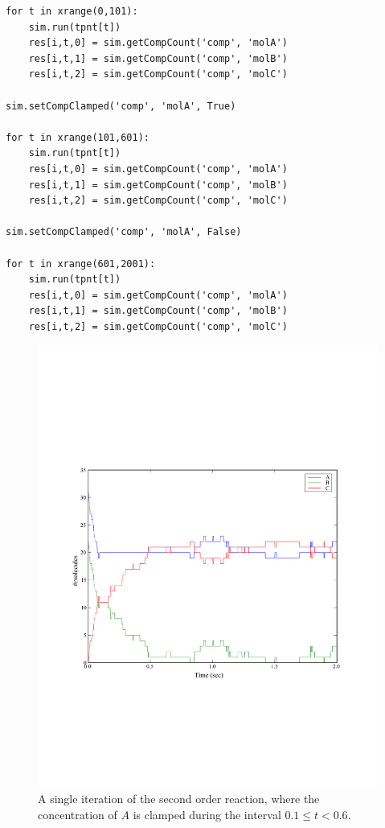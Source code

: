 \documentclass[a4paper,12pt]{book}
\begin{document}
\begin{verbatim}
for t in xrange(0,101):
    sim.run(tpnt[t])
    res[i,t,0] = sim.getCompCount('comp', 'molA')
    res[i,t,1] = sim.getCompCount('comp', 'molB')
    res[i,t,2] = sim.getCompCount('comp', 'molC')
    
sim.setCompClamped('comp', 'molA', True)

for t in xrange(101,601):
    sim.run(tpnt[t])
    res[i,t,0] = sim.getCompCount('comp', 'molA')
    res[i,t,1] = sim.getCompCount('comp', 'molB')
    res[i,t,2] = sim.getCompCount('comp', 'molC')
    
sim.setCompClamped('comp', 'molA', False)

for t in xrange(601,2001):
    sim.run(tpnt[t])
    res[i,t,0] = sim.getCompCount('comp', 'molA')
    res[i,t,1] = sim.getCompCount('comp', 'molB')
    res[i,t,2] = sim.getCompCount('comp', 'molC')
\end{verbatim}

\begin{figure}
\centering
\includegraphics[width=13cm]{secondorderreaction05.pdf}
\caption{A single iteration of the second order reaction, where the concentration of $A$ is clamped during the interval $0.1 \leq t < 0.6$.}
\label{fig:secondorderreaction05}
\end{figure}
\end{document}
